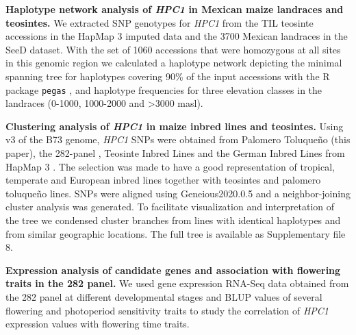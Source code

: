 \documentclass[9pt,twocolumn,twoside,lineno]{BioRxiv}
\def\code#1{\texttt{#1}}
\begin{document}
\textbf{Haplotype network analysis of \textit{HPC1} in Mexican maize landraces and teosintes.}
We extracted SNP genotypes for \textit{HPC1} from the TIL teosinte accessions in the HapMap 3 imputed data \cite{Bukowski2017-ng} and the 3700 Mexican landraces in the SeeD dataset. 
With the set of 1060 accessions that were homozygous at all sites in this genomic region we calculated a haplotype network depicting the minimal spanning tree for haplotypes covering 90\% of the input accessions with the R package \code{pegas} \cite{paradis2010}, and haplotype frequencies for three elevation classes in the landraces (0-1000, 1000-2000 and >3000 masl).

\textbf{Clustering analysis of \textit{HPC1} in maize inbred lines and teosintes.}
Using v3 of the B73 genome, \textit{HPC1} SNPs were obtained from Palomero Toluqueño (this paper), the 282-panel \cite{Flint-Garcia2005-hb}, Teosinte Inbred Lines and the German Inbred Lines from HapMap 3 \cite{Bukowski2017-ng}. 
The selection was made to have a good representation of tropical, temperate and European inbred lines together with teosintes and palomero toluqueño lines.
SNPs were aligned using Geneious2020.0.5 and a neighbor-joining cluster analysis was generated. 
To facilitate visualization and interpretation of the tree we condensed cluster branches from lines with identical haplotypes and from similar geographic locations. 
The full tree is available as Supplementary file 8. 

\textbf{Expression analysis of candidate genes and association with flowering traits in the 282 panel.}
We used gene expression RNA-Seq data obtained from the 282 panel at different developmental stages \cite{Kremling2018-gn} and BLUP values of several flowering and photoperiod sensitivity traits \cite{Hung2012-ms} to study the correlation of \textit{HPC1} expression values with flowering time traits.  
\end{document}

